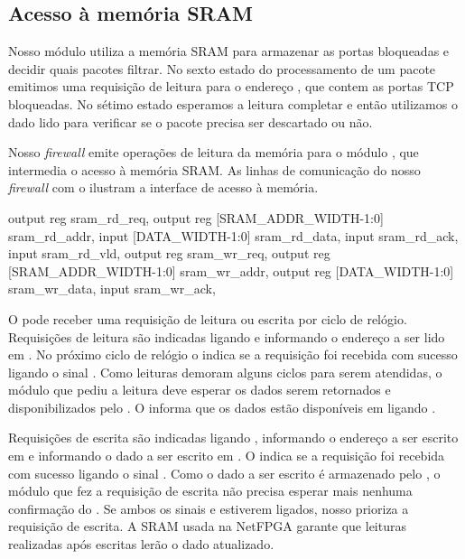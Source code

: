 \subsection{Acesso à memória SRAM}
\label{sec:impl.mem}

Nosso módulo utiliza a memória SRAM para armazenar as portas bloqueadas
e decidir quais pacotes filtrar.  No sexto estado do processamento de um
pacote emitimos uma requisição de leitura para o endereço
, que contem as portas TCP bloqueadas.  No sétimo
estado esperamos a leitura completar e então utilizamos o dado lido para
verificar se o pacote precisa ser descartado ou não.

Nosso \emph{firewall} emite operações de leitura da memória para o
módulo , que intermedia o acesso à memória SRAM.  As
linhas de comunicação do nosso \emph{firewall} com o 
ilustram a interface de acesso à memória.

\begin{verilogcode}
      output reg                       sram_rd_req,
      output reg [SRAM_ADDR_WIDTH-1:0] sram_rd_addr,
      input [DATA_WIDTH-1:0]           sram_rd_data,
      input                            sram_rd_ack,
      input                            sram_rd_vld,
      output reg                       sram_wr_req,
      output reg [SRAM_ADDR_WIDTH-1:0] sram_wr_addr,
      output reg [DATA_WIDTH-1:0]      sram_wr_data,
      input                            sram_wr_ack,
\end{verilogcode}

O  pode receber uma requisição de leitura ou escrita
por ciclo de relógio.  Requisições de leitura são indicadas ligando
 e informando o endereço a ser lido em
.  No próximo ciclo de relógio o 
indica se a requisição foi recebida com sucesso ligando o sinal
.  Como leituras demoram alguns ciclos para serem
atendidas, o módulo que pediu a leitura deve esperar os dados serem
retornados e disponibilizados pelo .  O
 informa que os dados estão disponíveis em
 ligando .

Requisições de escrita são indicadas ligando ,
informando o endereço a ser escrito em  e informando
o dado a ser escrito em .  O 
indica se a requisição foi recebida com sucesso ligando o sinal
.  Como o dado a ser escrito é armazenado pelo
, o módulo que fez a requisição de escrita não
precisa esperar mais nenhuma confirmação do .  Se
ambos os sinais  e  estiverem
ligados, nosso  prioriza a requisição de escrita.  A
SRAM usada na NetFPGA garante que leituras realizadas após escritas
lerão o dado atualizado.

